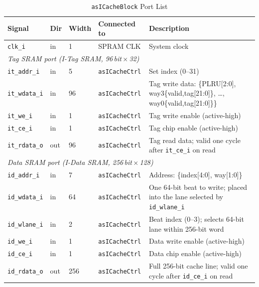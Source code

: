 \begin{table}[H]
\caption{\texttt{asICacheBlock} Port List}
\label{tab:asICacheBlockPorts}
\centering
\begin{tabularx}{\textwidth}{|l |l |l |l |X|}
  \hline
  Signal & Dir & Width & Connected to & Description \\
  \hline
  \hline
  \texttt{clk\_i}         & in  & 1   & SPRAM CLK         & System clock \\
  \hline
  \multicolumn{5}{|l|}{\textit{Tag SRAM port (I-Tag SRAM, 96\,bit\,$\times$\,32)}} \\
  \hline
  \texttt{it\_addr\_i}    & in  & 5   & \texttt{asICacheCtrl} & Set index (0--31) \\
  \hline
  \texttt{it\_wdata\_i}   & in  & 96  & \texttt{asICacheCtrl} & Tag write data: \{PLRU[2:0], way3\{valid,tag[21:0]\}, \ldots, way0\{valid,tag[21:0]\}\} \\
  \hline
  \texttt{it\_we\_i}      & in  & 1   & \texttt{asICacheCtrl} & Tag write enable (active-high) \\
  \hline
  \texttt{it\_ce\_i}      & in  & 1   & \texttt{asICacheCtrl} & Tag chip enable (active-high) \\
  \hline
  \texttt{it\_rdata\_o}   & out & 96  & \texttt{asICacheCtrl} & Tag read data; valid one cycle after \texttt{it\_ce\_i} on read \\
  \hline
  \multicolumn{5}{|l|}{\textit{Data SRAM port (I-Data SRAM, 256\,bit\,$\times$\,128)}} \\
  \hline
  \texttt{id\_addr\_i}    & in  & 7   & \texttt{asICacheCtrl} & Address: \{index[4:0], way[1:0]\} \\
  \hline
  \texttt{id\_wdata\_i}   & in  & 64  & \texttt{asICacheCtrl} & One 64-bit beat to write; placed into the lane selected by \texttt{id\_wlane\_i} \\
  \hline
  \texttt{id\_wlane\_i}   & in  & 2   & \texttt{asICacheCtrl} & Beat index (0--3); selects 64-bit lane within 256-bit word \\
  \hline
  \texttt{id\_we\_i}      & in  & 1   & \texttt{asICacheCtrl} & Data write enable (active-high) \\
  \hline
  \texttt{id\_ce\_i}      & in  & 1   & \texttt{asICacheCtrl} & Data chip enable (active-high) \\
  \hline
  \texttt{id\_rdata\_o}   & out & 256 & \texttt{asICacheCtrl} & Full 256-bit cache line; valid one cycle after \texttt{id\_ce\_i} on read \\
  \hline
\end{tabularx}
\end{table}

